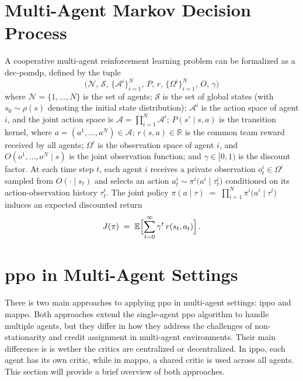 \section{Multi-Agent Markov Decision Process}
A cooperative multi-agent reinforcement learning problem can be formalized as a \gls{dec-pomdp}\cite{oliehoek_concise_2016}, defined by the tuple
\[
  \bigl(\mathcal{N},\,\mathcal{S},\,\{\mathcal{A}^i\}_{i=1}^N,\,P,\,r,\,\{\Omega^i\}_{i=1}^N,\,O,\,\gamma\bigr)
\]
where $\mathcal{N}=\{1,\dots,N\}$ is the set of agents; $\mathcal{S}$ is the set of global states (with $s_0\sim\rho(s)$ denoting the initial state distribution); $\mathcal{A}^i$ is the action space of agent $i$, and the joint action space is $\mathcal{A} = \prod_{i=1}^N \mathcal{A}^i$; $P(s' \mid s, a)$ is the transition kernel, where $a=(a^1,\dots,a^N)\in\mathcal{A}$; $r(s,a)\in\mathbb{R}$ is the common team reward received by all agents; $\Omega^i$ is the observation space of agent $i$, and $O(o^1,\dots,o^N\mid s)$ is the joint observation function; and $\gamma\in[0,1)$ is the discount factor.
At each time step $t$, each agent $i$ receives a private observation $o^i_t \in \Omega^i$ sampled from $O(\cdot\mid s_t)$ and selects an action 
$a^i_t \sim \pi^i\bigl(a^i \mid \tau^i_t\bigr)$
conditioned on its action-observation history $\tau^i_t$. The joint policy 
$\pi(a\mid \tau) \;=\; \prod_{i=1}^N \pi^i\bigl(a^i\mid \tau^i\bigr)$
induces an expected discounted return
\[
  J(\pi) \;=\; \mathbb{E}\Bigl[\sum_{t=0}^\infty \gamma^t\,r(s_t, a_t)\Bigr]\,. 
\]

\section{\gls{ppo} in Multi-Agent Settings}
There is two main approaches to applying \gls{ppo} in multi-agent settings: \gls{ippo} and \gls{mappo}. Both approaches extend the single-agent \gls{ppo} algorithm to handle multiple agents, but they differ in how they address the challenges of non-stationarity and credit assignment in multi-agent environments. Their main difference is is wether the critics are centralized or decentralized. In \gls{ippo}, each agent has its own critic, while in \gls{mappo}, a shared critic is used across all agents. This section will provide a brief overview of both approaches.

